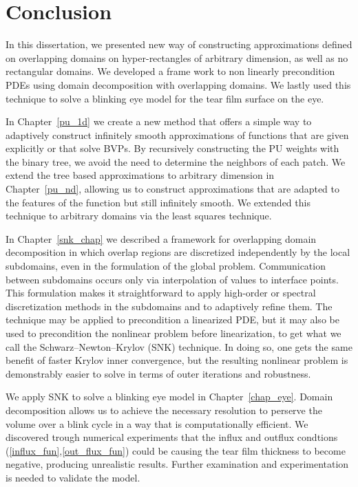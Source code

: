 \chapter{Conclusion}

In this dissertation, we presented new way of constructing approximations defined on overlapping domains on hyper-rectangles of arbitrary dimension, as well as no rectangular domains. We developed a frame work to non linearly precondition PDEs using domain decomposition with overlapping domains. We lastly used this technique to solve a blinking eye model for the tear film surface on the eye.


In Chapter~\ref{pu_1d} we create a new method that offers a simple way to adaptively construct infinitely smooth approximations of functions that are given explicitly or that solve BVPs. By recursively constructing the PU weights with the binary tree, we avoid the need to determine the neighbors of each patch. We extend the tree based approximations to arbitrary dimension in Chapter~\ref{pu_nd}, allowing us to construct approximations that are adapted to the features of the function but still infinitely smooth. We extended this technique to arbitrary domains via the least squares technique. 

In Chapter~\ref{snk_chap} we described a framework for overlapping domain decomposition in which overlap regions are discretized independently by the local subdomains, even in the formulation of the global problem. Communication between subdomains occurs only via interpolation of values to interface points. This formulation makes it straightforward to apply high-order or spectral discretization methods in the subdomains and to adaptively refine them. The technique may be applied to precondition a linearized PDE, but it may also be used to precondition the nonlinear problem before linearization, to get what we call the Schwarz--Newton--Krylov (SNK) technique. In doing so, one gets the same benefit of faster Krylov inner convergence, but the resulting nonlinear problem is demonstrably easier to solve in terms of outer iterations and robustness. 

We apply SNK to solve a blinking eye model in Chapter~\ref{chap_eye}. Domain decomposition allows us to achieve the necessary resolution to perserve the volume over a blink cycle in a way that is computationally efficient. We discovered trough numerical experiments that the influx and outflux condtions (\ref{influx_fun},\ref{out_flux_fun}) could be causing the tear film thickness to become negative, producing unrealistic results. Further examination and experimentation is needed to validate the model.

